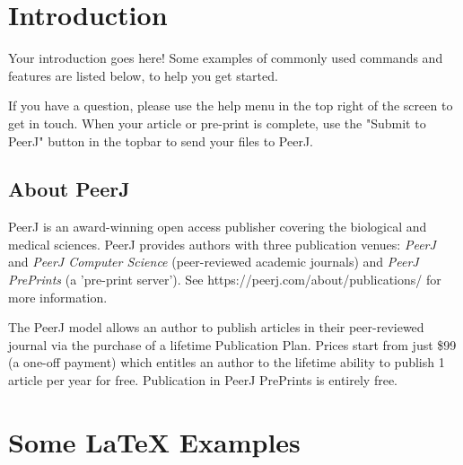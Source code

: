 \documentclass[fleqn,10pt]{wlpeerj} %
\begin{document}





















\iffalse

\newpage{}
\section*{Introduction}

Your introduction goes here! Some examples of commonly used commands and features are listed below, to help you get started.

If you have a question, please use the help menu in the top right of the screen to get in touch. When your article or pre-print is complete, use the "Submit to PeerJ" button in the topbar to send your files to PeerJ.

\subsection*{About PeerJ}

PeerJ is an award-winning open access publisher covering the biological and medical sciences.  PeerJ provides authors with three publication venues: \textit{PeerJ} and \textit{PeerJ Computer Science} (peer-reviewed academic journals) and \textit{PeerJ PrePrints} (a 'pre-print server'). See https://peerj.com/about/publications/ for more information.

The PeerJ model allows an author to publish articles in their peer-reviewed journal via the purchase of a lifetime Publication Plan. Prices start from just \$99 (a one-off payment) which entitles an author to the lifetime ability to publish 1 article per year for free. Publication in PeerJ PrePrints is entirely free.

\section*{Some \LaTeX{} Examples}
\label{sec:examples}
\end{document}
